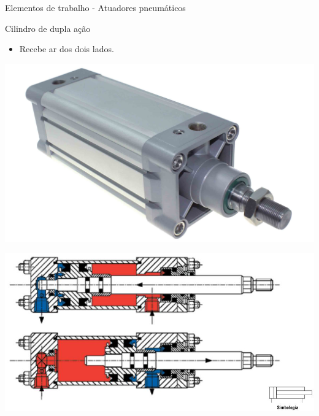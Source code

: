 \begin{frame}{Elementos de trabalho - Atuadores pneumáticos}
	\begin{block}{Cilindro de dupla ação}
		\begin{itemize}
			\item Recebe ar dos dois lados.
		\end{itemize}
	\end{block}

	\medskip
	
	\begin{minipage}[c]{0.38\linewidth}
		\centering
		\includegraphics[width=1\linewidth]{Figuras/Ch14/fig33}
	\end{minipage}
	\hfill
	\begin{minipage}[c]{0.58\linewidth}
		\centering
		\includegraphics[width=1\linewidth]{Figuras/Ch14/fig34}
	\end{minipage}

\end{frame}


